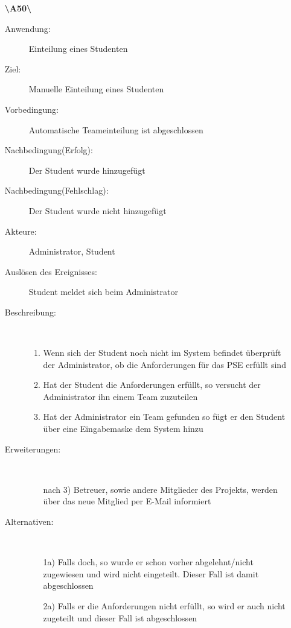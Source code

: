 \documentclass[parskip=full]{scrartcl}
\begin{document}
\begin{enumerate}
  \item[\textbf{\textbackslash A50\textbackslash}] \begin{description}
  \item[Anwendung:] Einteilung eines Studenten
  \item[Ziel:] Manuelle Einteilung eines Studenten
  	\item[Vorbedingung:] Automatische Teameinteilung ist abgeschlossen
  	\item[Nachbedingung(Erfolg):] Der Student wurde hinzugefügt
  	\item[Nachbedingung(Fehlschlag):] Der Student wurde nicht hinzugefügt
  	\item[Akteure:] Administrator, Student
  	\item[Auslösen des Ereignisses:] Student meldet sich beim Administrator
  	\item[Beschreibung:]~
  	 \begin{enumerate}[1.]
  	   \item Wenn sich der Student noch nicht im System befindet überprüft der
  	   Administrator, ob die Anforderungen für das PSE erfüllt sind
  	   \item Hat der Student die Anforderungen erfüllt, so versucht der
  	   Administrator ihn einem Team zuzuteilen
  	   \item Hat der Administrator ein Team gefunden so fügt er den Student über
  	   eine Eingabemaske dem System hinzu
  	 \end{enumerate}
  	\item[Erweiterungen:]~
  	 \begin{enumerate}
  	   \item [nach 3)] Betreuer, sowie andere Mitglieder des Projekts, werden
  	   über das neue Mitglied per E-Mail informiert 
  	 \end{enumerate}  
  	\item[Alternativen:] ~
  	 \begin{enumerate}
  	  \item[1a)] Falls doch, so wurde er schon vorher abgelehnt/nicht zugewiesen
  	  und wird nicht eingeteilt. Dieser Fall ist damit abgeschlossen
  	  \item [2a)] Falls er die Anforderungen nicht erfüllt, so wird er auch nicht
  	  zugeteilt und dieser Fall ist abgeschlossen
  	 \end{enumerate}  
  \end{description}
  \pagebreak
  

\end{enumerate}
\end{document}
